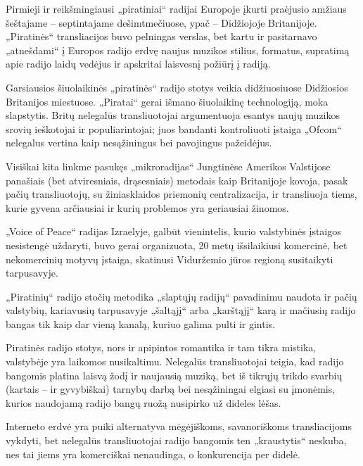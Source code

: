 \documentclass[kursinis-darbas]{vukf}
\begin{document}
%
%

\vukfConclusion


Pirmieji ir reikšmingiausi „piratiniai“ radijai Europoje įkurti praėjusio amžiaus šeštajame – septintajame dešimtmečiuose, ypač – Didžiojoje Britanijoje. „Piratinės“ transliacijos buvo pelningas verslas, bet kartu ir pasitarnavo „atnešdami“ į Europos radijo erdvę naujus muzikos stilius, formatus, supratimą apie radijo laidų vedėjus ir apskritai laisvesnį požiūrį į radiją.

Garsiausios šiuolaikinės „piratinės“ radijo stotys veikia didžiuosiuose Didžiosios Britanijos miestuose. „Piratai“ gerai išmano šiuolaikinę technologiją, moka slapstytis. Britų nelegalūs transliuotojai argumentuoja esantys naujų muzikos srovių ieškotojai ir populiarintojai; juos bandanti kontroliuoti įstaiga „Ofcom“ nelegalus vertina kaip nesąžiningus bei pavojingus pažeidėjus.

Visiškai kita linkme pasukęs „mikroradijas“ Jungtinėse Amerikos Valstijose panašiais (bet atviresniais, drąsesniais) metodais kaip Britanijoje kovoja, pasak pačių transliuotojų, su žiniasklaidos priemonių centralizacija, ir transliuoja tiems, kurie gyvena arčiausiai ir kurių problemos yra geriausiai žinomos.

„Voice of Peace“ radijas Izraelyje, galbūt vienintelis, kurio valstybinės įstaigos nesistengė uždaryti, buvo gerai organizuota, 20 metų išsilaikiusi komercinė, bet nekomercinių motyvų įstaiga, skatinusi Viduržemio jūros regioną susitaikyti tarpusavyje.

„Piratinių“ radijo stočių metodika „slaptųjų radijų“ pavadinimu naudota ir pačių valstybių, kariavusių tarpusavyje „šaltąjį“ arba „karštąjį“ karą ir mačiusių radijo bangas tik kaip dar vieną kanalą, kuriuo galima pulti ir gintis.

Piratinės radijo stotys, nors ir apipintos romantika ir tam tikra mistika, valstybėje yra laikomos nusikaltimu. Nelegalūs transliuotojai teigia, kad radijo bangomis platina laisvą žodį ir naujausią muziką, bet iš tikrųjų trikdo svarbių (kartais – ir gyvybiškai) tarnybų darbą bei nesąžiningai elgiasi su įmonėmis, kurios naudojamą radijo bangų ruožą nusipirko už dideles lėšas.

Interneto erdvė yra puiki alternatyva mėgėjiškoms, savanoriškoms transliacijoms vykdyti, bet nelegalūs transliuotojai radijo bangomis ten „kraustytis“ neskuba, nes tai jiems yra komerciškai nenaudinga, o konkurencija per didelė.


%
%


\end{document}
